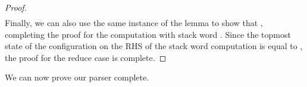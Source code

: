\begin{isabellebody}
\begin{isamarkuptext}
\begin{lemma}
\begin{proof}
\begin{multline*}
\end{multline*}
Finally, we can also use the same instance of the lemma to show that 
, completing the 
proof for the computation with stack word . Since the topmost state of the 
configuration on the RHS of the stack word computation is equal to , the proof for the
reduce case is complete.
\end{proof}
\end{lemma}

We can now prove our parser complete.


\end{isamarkuptext}
\end{isabellebody}
